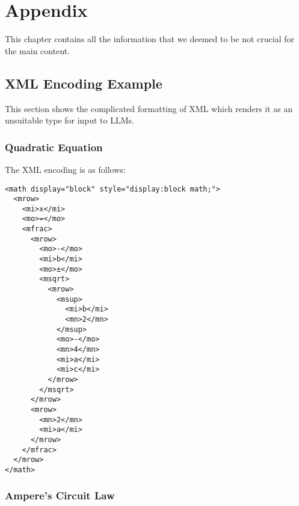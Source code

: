 \chapter{Appendix}

This chapter contains all the information that we deemed to be not crucial for the main content.


\section{XML Encoding Example}
This section shows the complicated formatting of XML which renders it as an unsuitable type for input to \ac{LLMs}.

\subsection{Quadratic Equation}
\label{app:xml_quadratic}

The XML encoding is as follows:
\begin{verbatim}
<math display="block" style="display:block math;">
  <mrow>
    <mi>x</mi>
    <mo>=</mo>
    <mfrac>
      <mrow>
        <mo>-</mo>
        <mi>b</mi>
        <mo>±</mo>
        <msqrt>
          <mrow>
            <msup>
              <mi>b</mi>
              <mn>2</mn>
            </msup>
            <mo>-</mo>
            <mn>4</mn>
            <mi>a</mi>
            <mi>c</mi>
          </mrow>
        </msqrt>
      </mrow>
      <mrow>
        <mn>2</mn>
        <mi>a</mi>
      </mrow>
    </mfrac>
  </mrow>
</math>
\end{verbatim}

\subsection{Ampere's Circuit Law}

\label{app:xml_ampere}

